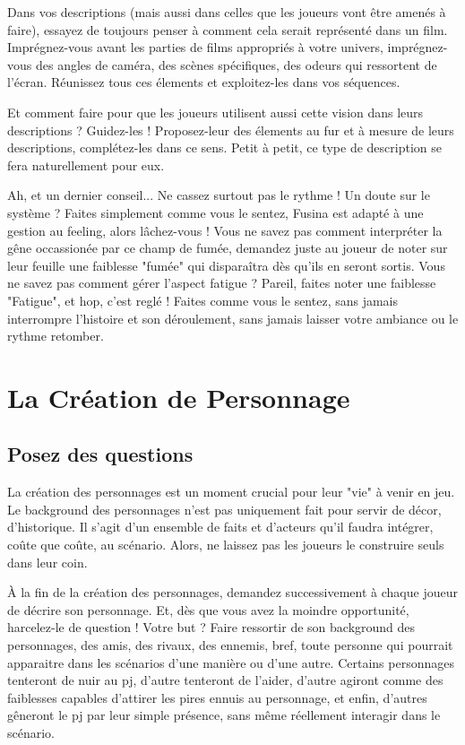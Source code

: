 \documentclass{conf/FusinaClass}
\begin{document}
Dans vos descriptions (mais aussi dans celles que les joueurs vont être amenés à faire), essayez de toujours penser à comment cela serait représenté dans un film. Imprégnez-vous avant les parties de films appropriés à votre univers, imprégnez-vous des angles de caméra, des scènes spécifiques, des odeurs qui ressortent de l'écran. Réunissez tous ces élements et exploitez-les dans vos séquences.

Et comment faire pour que les joueurs utilisent aussi cette vision dans leurs descriptions ? Guidez-les ! Proposez-leur des élements au fur et à mesure de leurs descriptions, complétez-les dans ce sens. Petit à petit, ce type de description se fera naturellement pour eux. 

Ah, et un dernier conseil... Ne cassez surtout pas le rythme ! Un doute sur le système ? Faites simplement comme vous le sentez, Fusina est adapté à une gestion au feeling, alors lâchez-vous ! Vous ne savez pas comment interpréter la gêne occassionée par ce champ de fumée, demandez juste au joueur de noter sur leur feuille une faiblesse "fumée" qui disparaîtra dès qu'ils en seront sortis. Vous ne savez pas comment gérer l'aspect fatigue ? Pareil, faites noter une faiblesse "Fatigue", et hop, c'est reglé ! Faites comme vous le sentez, sans jamais interrompre l'histoire et son déroulement, sans jamais laisser votre ambiance ou le rythme retomber.

\chapter{La Création de Personnage}
\section{Posez des questions}
La création des personnages est un moment crucial pour leur "vie" à venir en jeu. Le background des personnages n'est pas uniquement fait pour servir de décor, d'historique. Il s'agit d'un ensemble de faits et d'acteurs qu'il faudra intégrer, coûte que coûte, au scénario. Alors, ne laissez pas les joueurs le construire seuls dans leur coin.

À la fin de la création des personnages, demandez successivement à chaque joueur de décrire son personnage. Et, dès que vous avez la moindre opportunité, harcelez-le de question ! Votre but ? Faire ressortir de son background des personnages, des amis, des rivaux, des ennemis, bref, toute personne qui pourrait apparaitre dans les scénarios d'une manière ou d'une autre. Certains personnages tenteront de nuir au pj, d'autre tenteront de l'aider, d'autre agiront comme des faiblesses capables d'attirer les pires ennuis au personnage, et enfin, d'autres gêneront le pj par leur simple présence, sans même réellement interagir dans le scénario. 
\end{document}
